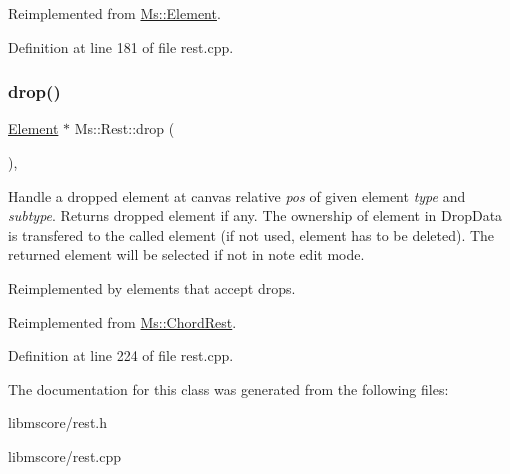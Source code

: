 Reimplemented from \hyperlink{class_ms_1_1_element_a35614445f0bc2212cbcc75c3f5810543}{Ms\+::\+Element}.



Definition at line 181 of file rest.\+cpp.

\mbox{\label{class_ms_1_1_rest_a4dec6c49aaf416289c5e2f78a2074c64}} 
\subsubsection{\texorpdfstring{drop()}{drop()}}
{\footnotesize\ttfamily \hyperlink{class_ms_1_1_element}{Element} $\ast$ Ms\+::\+Rest\+::drop (\begin{DoxyParamCaption}\item[{\hyperlink{class_ms_1_1_edit_data}{Edit\+Data} \&}]{ }\end{DoxyParamCaption})\hspace{0.3cm}{\ttfamily [override]}, {\ttfamily [virtual]}}

Handle a dropped element at canvas relative {\itshape pos} of given element {\itshape type} and {\itshape subtype}. Returns dropped element if any. The ownership of element in Drop\+Data is transfered to the called element (if not used, element has to be deleted). The returned element will be selected if not in note edit mode.

Reimplemented by elements that accept drops. 

Reimplemented from \hyperlink{class_ms_1_1_chord_rest_a1277a12746bf12af5cbf79d95ada6a21}{Ms\+::\+Chord\+Rest}.



Definition at line 224 of file rest.\+cpp.



The documentation for this class was generated from the following files\+:\begin{DoxyCompactItemize}
\item 
libmscore/rest.\+h\item 
libmscore/rest.\+cpp\end{DoxyCompactItemize}
